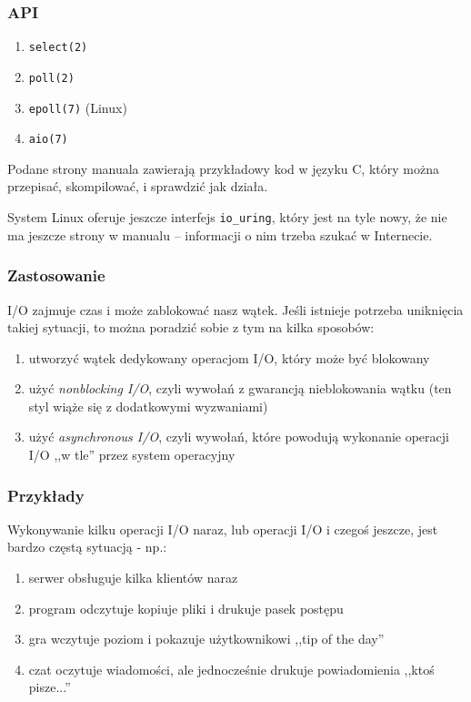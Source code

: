 \documentclass[aspectratio=169]{beamer}
\begin{document}
\begin{frame}
    \frametitle{API}

    \begin{enumerate}
        \item \texttt{select(2)}
        \item \texttt{poll(2)}
        \item \texttt{epoll(7)} (Linux)
        \item \texttt{aio(7)}
    \end{enumerate}

    Podane strony manuala zawierają przykładowy kod w języku C, który można
    przepisać, skompilować, i sprawdzić jak działa.

    \vspace{1em}
    {\tiny
    System Linux oferuje jeszcze interfejs \texttt{io\_uring}, który jest na
    tyle nowy, że nie ma jeszcze strony w manualu -- informacji o nim trzeba
    szukać w Internecie.}
\end{frame}

\begin{frame}
    \frametitle{Zastosowanie}

    I/O zajmuje czas i może zablokować nasz wątek. Jeśli istnieje potrzeba
    uniknięcia takiej sytuacji, to można poradzić sobie z tym na kilka sposobów:

    \begin{enumerate}
        \item utworzyć wątek dedykowany operacjom I/O, który może być blokowany
        \item użyć \emph{nonblocking I/O}, czyli wywołań z gwarancją nieblokowania
            wątku (ten styl wiąże się z dodatkowymi wyzwaniami)
        \item użyć \emph{asynchronous I/O}, czyli wywołań, które powodują
            wykonanie operacji I/O ,,w tle'' przez system operacyjny
    \end{enumerate}
\end{frame}

\begin{frame}
    \frametitle{Przykłady}

    Wykonywanie kilku operacji I/O naraz, lub operacji I/O i czegoś jeszcze,
    jest bardzo częstą sytuacją - np.:

    \begin{enumerate}
        \item serwer obsługuje kilka klientów naraz
        \item program odczytuje kopiuje pliki i drukuje pasek postępu
        \item gra wczytuje poziom i pokazuje użytkownikowi ,,tip of the day''
        \item czat oczytuje wiadomości, ale jednocześnie drukuje powiadomienia
            ,,ktoś pisze...''
    \end{enumerate}
\end{frame}
\end{document}

